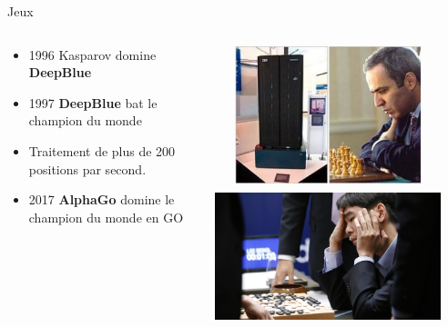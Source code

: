 \documentclass{beamer}
\begin{document}
\begin{frame}[t]{Jeux}
  \begin{columns}
    \begin{column}{0.5\textwidth}
      \scriptsize{ 
      \begin{itemize}
        \item 1996  Kasparov domine \textbf{DeepBlue} 
        \item 1997 \textbf{DeepBlue} bat le champion du monde 
        \item Traitement de plus de 200 positions par second.
        \item 2017 \textbf{AlphaGo} domine le champion du monde en \alert{GO}  
      \end{itemize}
    }
    \end{column}
    \begin{column}{0.5\textwidth}
      \includegraphics[width=0.9\textwidth,
      height=4cm]{./images/deepBlue_kasparov.jpg} 
      \includegraphics[width=0.9\textwidth,
    height=4cm]{./images/alphago-2.jpg} 
    \end{column}
  \end{columns}
\end{frame}

\end{document}

